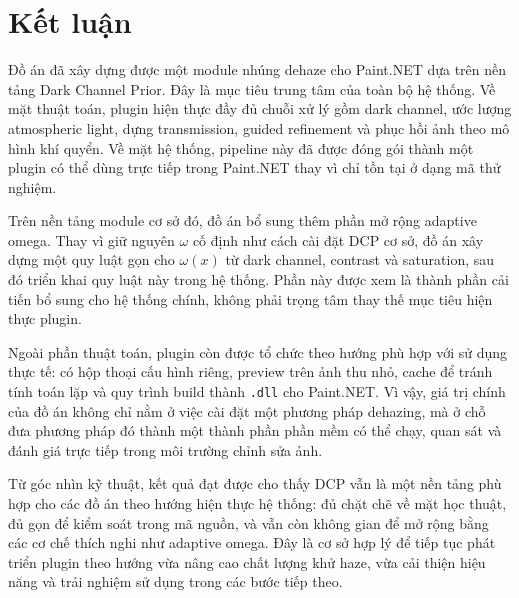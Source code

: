 \section{Kết luận}

Đồ án đã xây dựng được một module nhúng dehaze cho Paint.NET dựa trên nền tảng Dark Channel Prior. Đây là mục tiêu trung tâm của toàn bộ hệ thống. Về mặt thuật toán, plugin hiện thực đầy đủ chuỗi xử lý gồm dark channel, ước lượng atmospheric light, dựng transmission, guided refinement và phục hồi ảnh theo mô hình khí quyển. Về mặt hệ thống, pipeline này đã được đóng gói thành một plugin có thể dùng trực tiếp trong Paint.NET thay vì chỉ tồn tại ở dạng mã thử nghiệm.

Trên nền tảng module cơ sở đó, đồ án bổ sung thêm phần mở rộng adaptive omega. Thay vì giữ nguyên \(\omega\) cố định như cách cài đặt DCP cơ sở, đồ án xây dựng một quy luật gọn cho \(\omega(x)\) từ dark channel, contrast và saturation, sau đó triển khai quy luật này trong hệ thống. Phần này được xem là thành phần cải tiến bổ sung cho hệ thống chính, không phải trọng tâm thay thế mục tiêu hiện thực plugin.

Ngoài phần thuật toán, plugin còn được tổ chức theo hướng phù hợp với sử dụng thực tế: có hộp thoại cấu hình riêng, preview trên ảnh thu nhỏ, cache để tránh tính toán lặp và quy trình build thành \texttt{.dll} cho Paint.NET. Vì vậy, giá trị chính của đồ án không chỉ nằm ở việc cài đặt một phương pháp dehazing, mà ở chỗ đưa phương pháp đó thành một thành phần phần mềm có thể chạy, quan sát và đánh giá trực tiếp trong môi trường chỉnh sửa ảnh.

Từ góc nhìn kỹ thuật, kết quả đạt được cho thấy DCP vẫn là một nền tảng phù hợp cho các đồ án theo hướng hiện thực hệ thống: đủ chặt chẽ về mặt học thuật, đủ gọn để kiểm soát trong mã nguồn, và vẫn còn không gian để mở rộng bằng các cơ chế thích nghi như adaptive omega. Đây là cơ sở hợp lý để tiếp tục phát triển plugin theo hướng vừa nâng cao chất lượng khử haze, vừa cải thiện hiệu năng và trải nghiệm sử dụng trong các bước tiếp theo.

